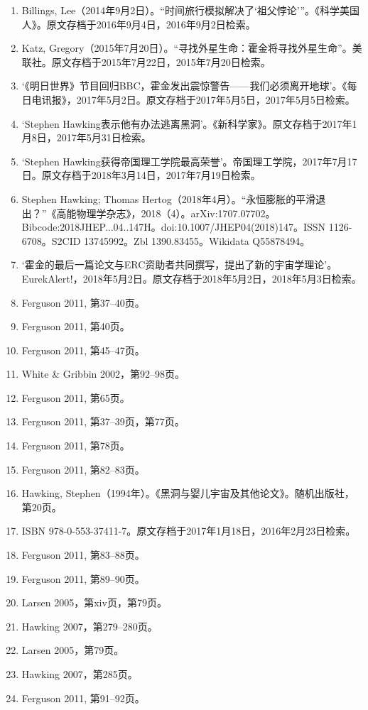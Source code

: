 \begin{enumerate}
\item Billings, Lee（2014年9月2日）。“时间旅行模拟解决了‘祖父悖论’”。《科学美国人》。原文存档于2016年9月4日，2016年9月2日检索。  
\item Katz, Gregory（2015年7月20日）。“寻找外星生命：霍金将寻找外星生命”。美联社。原文存档于2015年7月22日，2015年7月20日检索。  
\item ‘《明日世界》节目回归BBC，霍金发出震惊警告——我们必须离开地球’。《每日电讯报》，2017年5月2日。原文存档于2017年5月5日，2017年5月5日检索。  
\item ‘Stephen Hawking表示他有办法逃离黑洞’。《新科学家》。原文存档于2017年1月8日，2017年5月31日检索。  
\item ‘Stephen Hawking获得帝国理工学院最高荣誉’。帝国理工学院，2017年7月17日。原文存档于2018年3月14日，2017年7月19日检索。  
\item Stephen Hawking; Thomas Hertog（2018年4月）。“永恒膨胀的平滑退出？”《高能物理学杂志》，2018（4）。arXiv:1707.07702。Bibcode:2018JHEP...04..147H。doi:10.1007/JHEP04(2018)147。ISSN 1126-6708。S2CID 13745992。Zbl 1390.83455。Wikidata Q55878494。  
\item ‘霍金的最后一篇论文与ERC资助者共同撰写，提出了新的宇宙学理论’。EurekAlert!，2018年5月2日。原文存档于2018年5月2日，2018年5月3日检索。  
\item Ferguson 2011, 第37–40页。  
\item Ferguson 2011, 第40页。  
\item Ferguson 2011, 第45–47页。  
\item White & Gribbin 2002，第92–98页。  
\item Ferguson 2011, 第65页。  
\item Ferguson 2011, 第37–39页，第77页。  
\item Ferguson 2011, 第78页。  
\item Ferguson 2011, 第82–83页。  
\item Hawking, Stephen（1994年）。《黑洞与婴儿宇宙及其他论文》。随机出版社，第20页。\item ISBN 978-0-553-37411-7。原文存档于2017年1月18日，2016年2月23日检索。  
\item Ferguson 2011, 第83–88页。  
\item Ferguson 2011, 第89–90页。  
\item Larsen 2005，第xiv页，第79页。  
\item Hawking 2007，第279–280页。  
\item Larsen 2005，第79页。  
\item Hawking 2007，第285页。  
\item Ferguson 2011, 第91–92页。  

\end{enumerate}
